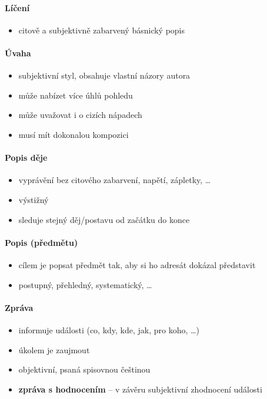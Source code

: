 \paragraph{Líčení}
\begin{itemize}
\item citově a subjektivně zabarvený básnický popis
\end{itemize}

\paragraph{Úvaha}
\begin{itemize}
\item subjektivní styl, obsahuje vlastní názory autora
\item může nabízet více úhlů pohledu
\item může uvažovat i o cizích nápadech
\item musí mít dokonalou kompozici
\end{itemize}

\paragraph{Popis děje}
\begin{itemize}
\item vyprávění bez citového zabarvení, napětí, zápletky, \ldots
\item výstižný
\item sleduje stejný děj/postavu od začátku do konce
\end{itemize}

\paragraph{Popis (předmětu)}
\begin{itemize}
\item cílem je popsat předmět tak, aby si ho adresát dokázal představit
\item postupný, přehledný, systematický, \ldots
\end{itemize}

\paragraph{Zpráva}
\begin{itemize}
\item informuje události (co, kdy, kde, jak, pro koho, \ldots)
\item úkolem je zaujmout
\item objektivní, psaná spisovnou češtinou
\item \textbf{zpráva s hodnocením} -- v závěru subjektivní zhodnocení události
\end{itemize}


